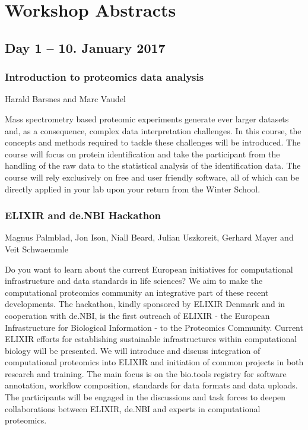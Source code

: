 \section*{\color{eubicRed} Workshop Abstracts}

\subsection*{Day 1 -- 10. January 2017}

\subsubsection*{\color{eubicRed} Introduction to proteomics data analysis}
{\color{eubicGray}Harald Barsnes and Marc Vaudel}

Mass spectrometry based proteomic experiments generate ever larger datasets and,
as a consequence, complex data interpretation challenges. In this course, the
concepts and methods required to tackle these challenges will be introduced. The
course will focus on protein identification and take the participant from the
handling of the raw data to the statistical analysis of the identification data.
The course will rely exclusively on free and user friendly software, all of
which can be directly applied in your lab upon your return from the Winter
School.


\subsubsection*{\color{eubicRed} ELIXIR and de.NBI Hackathon}
{\color{eubicGray} Magnus Palmblad, Jon Ison, Niall Beard, Julian Uszkoreit, Gerhard Mayer and Veit Schwaemmle}

Do you want to learn about the current European initiatives for computational
infrastructure and data standards in life sciences? We aim to make the
computational proteomics community an integrative part of these recent
developments. The hackathon, kindly sponsored by ELIXIR Denmark and in
cooperation with de.NBI, is the first outreach of ELIXIR - the European
Infrastructure for Biological Information - to the Proteomics Community. Current
ELIXIR efforts for establishing sustainable infrastructures within computational
biology will be presented. We will introduce and discuss integration of
computational proteomics into ELIXIR and initiation of common projects in both
research and training. The main focus is on the bio.tools registry for software
annotation, workflow composition, standards for data formats and data uploads.
The participants will be engaged in the discussions and task forces to deepen
collaborations between ELIXIR, de.NBI and experts in computational proteomics.


